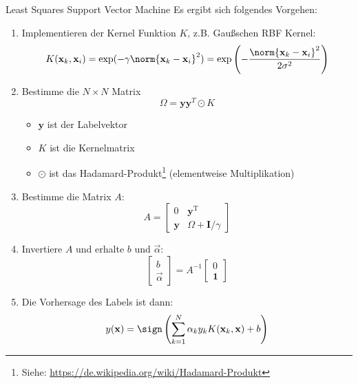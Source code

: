 \begin{defi}{Least Squares Support Vector Machine}
    Es ergibt sich folgendes Vorgehen:
    \begin{enumerate}
        \item Implementieren der Kernel Funktion $K$, z.B. Gaußschen RBF Kernel:
              \[
                  K(\mathbf{x}_k, \mathbf{x}_i) = \exp(-\gamma \norm{\mathbf{x}_k - \mathbf{x}_i}^2) = \exp \left( - \frac{\norm{\mathbf{x}_k - \mathbf{x}_i}^2}{2\sigma^2} \right)
              \]
        \item Bestimme die $N \times N$ Matrix
              \[
                  \Omega = \mathbf{y} \mathbf{y}^T \odot K
              \]
              \begin{itemize}
                  \item $\mathbf{y}$ ist der Labelvektor
                  \item $K$ ist die Kernelmatrix
                  \item $\odot$ ist das Hadamard-Produkt\footnote{Siehe: \href{https://de.wikipedia.org/wiki/Hadamard-Produkt}{https://de.wikipedia.org/wiki/Hadamard-Produkt}} (elementweise Multiplikation)
              \end{itemize}
        \item Bestimme die Matrix $A$:
              \[
                  A = \left[
                      \begin{array}{c|c}
                          0          & \mathbf{y}^\text{T}        \\
                          \hline
                          \mathbf{y} & \Omega + \mathbf{I}/\gamma
                      \end{array}
                      \right]
              \]
        \item Invertiere $A$ und erhalte $b$ und $\vec{\alpha}$:
              \[
                  \left[
                      \begin{array}{c}
                          b \\
                          \hline
                          \vec{\alpha}
                      \end{array}
                      \right]
                  = A^{-1}
                  \left[
                      \begin{array}{c}
                          0 \\
                          \hline
                          \mathbf{1}
                      \end{array}
                      \right]
              \]
        \item Die Vorhersage des Labels ist dann:
              \[
                  y(\mathbf{x}) = \sign \left( \sum_{k=1}^N \alpha_k y_k K(\mathbf{x}_k, \mathbf{x}) + b \right)
              \]
    \end{enumerate}
\end{defi}